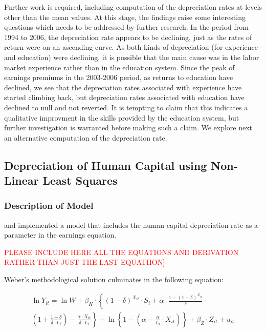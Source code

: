 \documentclass[12pt,a4paper]{article}
\numberwithin{equation}{section}
\begin{document}
Further work is required, including computation of the depreciation rates at levels other than the mean values. At this stage, the findings raise some interesting questions which needs to be addressed by further research. In the period from 1994 to 2006, the depreciation rate appears to be declining, just as the rates of return were on an ascending curve. As both kinds of depreciation (for experience and education) were declining, it is possible that the main cause was in the labor market experience rather than in the education system. Since the peak of earnings premiums in the 2003-2006 period, as returns to education have declined, we see that the depreciation rates associated with experience have started climbing back, but depreciation rates associated with education have declined to null and not reverted. It is tempting to claim that this indicates a qualitative improvment in the skills provided by the education system, but further investigation is warranted before making such a claim. We explore next an alternative computation of the depreciation rate. 

\subsection{Depreciation of Human Capital using Non-Linear Least Squares}

\subsubsection{Description of Model}

\citet{arrazola_132b._2005} and  \citep{weber_173._2008, weber_156._2011} implemented a model that includes the human capital depreciation rate as a parameter in the earnings equation.

\begin{Large}
\textcolor{red}{
PLEASE INCLUDE HERE ALL THE EQUATIONS AND DERIVATION RATHER THAN JUST THE LAST EQUATIION]}
\end{Large} 

Weber's methodological solution culminates in the following equation:
 
\begin{multline}\label{eq:six} 
	\ln Y_{i t}= \ln W+\beta_{K} \cdot\left\{(1-\delta)^{X_{i t}} \cdot S_{i}+\alpha \cdot \frac{1-(1-\delta)^{X_{i t}}}{\delta}\right.\cdot\\
	\left.\left(1+\frac{1-\delta}{\delta \cdot L_{i}}\right)-\frac{\alpha \cdot X_{i t}}{\delta \cdot L_{i}}\right\}+\ln \left\{1-\left(\alpha-\frac{\alpha}{L_{i}} \cdot X_{i t}\right)\right\}+\beta_{Z} \cdot Z_{i t}+u_{i t}
\end{multline}
\end{document}
